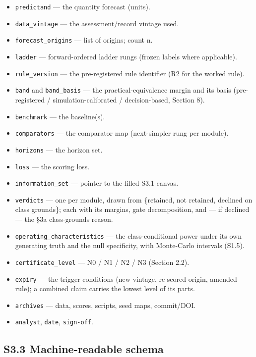\documentclass[11pt]{article}
\providecommand{\tightlist}{\setlength{\itemsep}{0.2em}\setlength{\parskip}{0pt}}
\begin{document}
\begin{itemize}
\tightlist
\item
  \texttt{predictand} --- the quantity forecast (units).
\item
  \texttt{data\_vintage} --- the assessment/record vintage used.
\item
  \texttt{forecast\_origins} --- list of origins; count n.
\item
  \texttt{ladder} --- forward-ordered ladder rungs (frozen labels where
  applicable).
\item
  \texttt{rule\_version} --- the pre-registered rule identifier (R2 for
  the worked rule).
\item
  \texttt{band} and \texttt{band\_basis} --- the practical-equivalence
  margin and its basis (pre-registered / simulation-calibrated /
  decision-based, Section 8).
\item
  \texttt{benchmark} --- the baseline(s).
\item
  \texttt{comparators} --- the comparator map (next-simpler rung per
  module).
\item
  \texttt{horizons} --- the horizon set.
\item
  \texttt{loss} --- the scoring loss.
\item
  \texttt{information\_set} --- pointer to the filled S3.1 canvas.
\item
  \texttt{verdicts} --- one per module, drawn from \{retained, not
  retained, declined on class grounds\}; each with its margins, gate
  decomposition, and --- if declined --- the §3a class-grounds reason.
\item
  \texttt{operating\_characteristics} --- the class-conditional power
  under its own generating truth and the null specificity, with
  Monte-Carlo intervals (S1.5).
\item
  \texttt{certificate\_level} --- N0 / N1 / N2 / N3 (Section 2.2).
\item
  \texttt{expiry} --- the trigger conditions (new vintage, re-scored
  origin, amended rule); a combined claim carries the lowest level of
  its parts.
\item
  \texttt{archives} --- data, scores, scripts, seed maps, commit/DOI.
\item
  \texttt{analyst}, \texttt{date}, \texttt{sign-off}.
\end{itemize}

\subsection{S3.3 Machine-readable
schema}\label{s3.3-machine-readable-schema}
\end{document}
